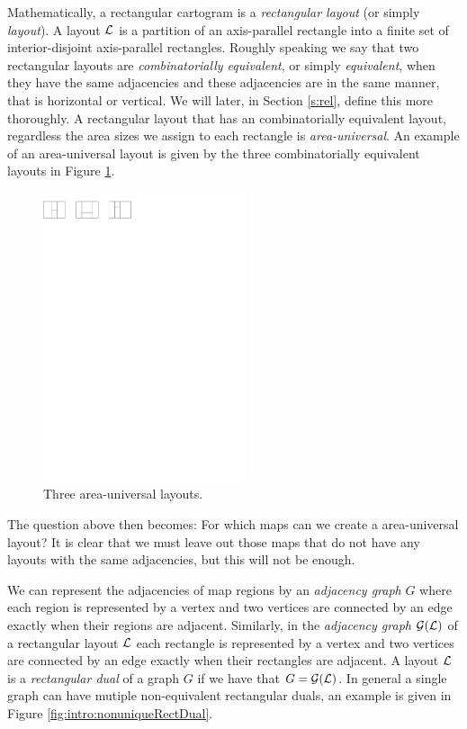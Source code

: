   Mathematically, a rectangular cartogram is a  \emph{rectangular layout} (or simply \emph{layout}).
  A layout $\mathcal{L}$ is a partition of an axis-parallel rectangle into a finite set of interior-disjoint axis-parallel rectangles.
  Roughly speaking we say that two rectangular layouts are \emph{combinatorially equivalent}, or simply \emph{equivalent}, when they have the same adjacencies and these adjacencies are in the same manner, that is horizontal or vertical. We will later, in Section \ref{s:rel}, define this more thoroughly.
  A rectangular layout that has an combinatorially equivalent layout, regardless the area sizes we assign to each rectangle is \emph{area-universal}. An example of an area-universal layout is given by the three combinatorially equivalent layouts in Figure \ref{fig:intro:areaunivLayout}.

  \begin{figure}
    \centering
    \includegraphics[width = 6cm]{introduction/img/areaunivLayout.pdf}
    \caption{Three area-universal layouts.}
    \label{fig:intro:areaunivLayout}
  \end{figure}

  The question above then becomes: For which maps can we create a area-universal layout?
  It is clear that we must leave out those maps that do not have any layouts with the same adjacencies, but this will not be enough.

  We can represent the adjacencies of map regions by an \emph{adjacency graph} $G$ where each region is represented by a vertex and two vertices are connected by an edge exactly when their regions are adjacent.
  Similarly, in the \emph{adjacency graph} $\mathcal{G}(\mathcal{L})$ of a rectangular layout $\mathcal{L}$ each rectangle is represented by a vertex and two vertices are connected by an edge exactly when their rectangles are adjacent.
  A layout $\mathcal{L}$ is a \emph{rectangular dual} of a graph $G$ if we have that $G = \mathcal{G}(\mathcal{L})$.
  In general a single graph can have mutiple non-equivalent rectangular duals, an example is given in Figure \ref{fig:intro:nonuniqueRectDual}.

